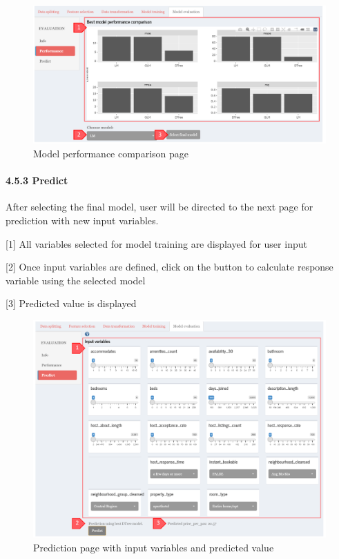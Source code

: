 \documentclass[
  12pt,
]{article}
\begin{document}
\begin{figure}[H]

{\centering \includegraphics[width=0.95\linewidth]{images/mdleval2} 

}

\caption{Model performance comparison page}\label{fig:unnamed-chunk-35}
\end{figure}

\hypertarget{predict}{%
\paragraph{4.5.3 Predict}\label{predict}}

After selecting the final model, user will be directed to the next page
for prediction with new input variables.

{[}1{]} All variables selected for model training are displayed for user
input

{[}2{]} Once input variables are defined, click on the button to
calculate response variable using the selected model

{[}3{]} Predicted value is displayed

\begin{figure}[H]

{\centering \includegraphics[width=0.95\linewidth]{images/mdleval3} 

}

\caption{Prediction page with input variables and predicted value}\label{fig:unnamed-chunk-36}
\end{figure}
\end{document}
